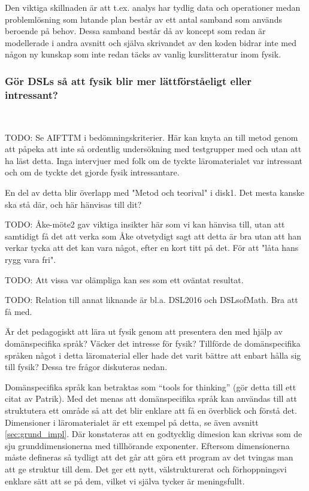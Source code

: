 \begin{binge}
Den viktiga skillnaden är att t.ex. analys har tydlig data och operationer 
medan problemlösning som lutande plan består av ett antal samband som används
beroende på behov. Dessa samband består då av koncept som redan är modellerade i
andra avsnitt och själva skrivandet av den koden bidrar inte med någon ny
kunskap som inte redan täcks av vanlig kurslitteratur inom fysik.

\subsubsection{Gör DSLs så att fysik blir mer lättförståeligt eller
intressant?}~\label{sec:bara_fysik}

TODO: Se AIFTTM i bedömningskriterier. Här kan knyta an till metod genom att
påpeka att inte så ordentlig undersökning med testgrupper med och utan att ha
läst detta. Inga intervjuer med folk om de tyckte läromaterialet var intressant
och om de tyckte det gjorde fysik intressantare.

En del av detta blir överlapp med "Metod och teorival" i disk1. Det mesta kanske
ska stå där, och här hänvisas till dit?

TODO: Åke-möte2 gav viktiga insikter här som vi kan hänvisa till, utan att
samtidigt få det att verka som Åke otvetydigt sagt att detta är bra utan att han
verkar tycka att det kan vara något, efter en kort titt på det. För att "låta
hans rygg vara fri".

TODO: Att vissa var olämpliga kan ses som ett oväntat resultat.

TODO: Relation till annat liknande är bl.a. DSL2016 och DSLsofMath. Bra att få
med.

Är det pedagogiskt att lära ut fysik genom att presentera den med hjälp av
domänspecifika språk? Väcker det intresse för fysik? Tillförde de domänspecifika
språken något i detta läromaterial eller hade det varit bättre att enbart hålla
sig till fysik? Dessa tre frågor diskuteras nedan.

Domänspecifika språk kan betraktas som ``tools for thinking'' (gör detta till
ett citat av Patrik). Med det menas att domänspecifika språk kan användas till
att struktutera ett område så att det blir enklare att få en överblick och
förstå det. Dimensioner i läromaterialet är ett exempel på detta, se även
avsnitt \ref{sec:grund_impl}. Där konstateras att en godtycklig dimesion kan
skrivas som de sju grunddimensionerna med tillhörande exponenter. Eftersom
dimensionerna måste defineras så tydligt att det går att göra ett program av det
tvingas man att ge struktur till dem. Det ger ett nytt, välstrukturerat och
förhoppningsvi enklare sätt att se på dem, vilket vi själva tycker är
meningsfullt.


\end{binge}
